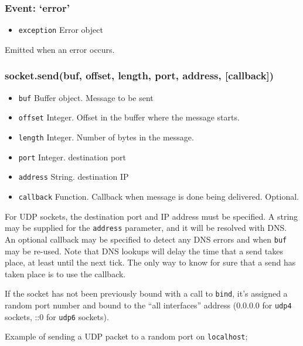 \subsubsection{Event: `error'}

\begin{itemize}
\item
  \texttt{exception} Error object
\end{itemize}

Emitted when an error occurs.

\subsubsection{socket.send(buf, offset, length, port, address,
{[}callback{]})}

\begin{itemize}
\item
  \texttt{buf} Buffer object. Message to be sent
\item
  \texttt{offset} Integer. Offset in the buffer where the message
  starts.
\item
  \texttt{length} Integer. Number of bytes in the message.
\item
  \texttt{port} Integer. destination port
\item
  \texttt{address} String. destination IP
\item
  \texttt{callback} Function. Callback when message is done being
  delivered. Optional.
\end{itemize}

For UDP sockets, the destination port and IP address must be specified.
A string may be supplied for the \texttt{address} parameter, and it will
be resolved with DNS. An optional callback may be specified to detect
any DNS errors and when \texttt{buf} may be re-used. Note that DNS
lookups will delay the time that a send takes place, at least until the
next tick. The only way to know for sure that a send has taken place is
to use the callback.

If the socket has not been previously bound with a call to
\texttt{bind}, it's assigned a random port number and bound to the ``all
interfaces'' address (0.0.0.0 for \texttt{udp4} sockets, ::0 for
\texttt{udp6} sockets).

Example of sending a UDP packet to a random port on \texttt{localhost};


